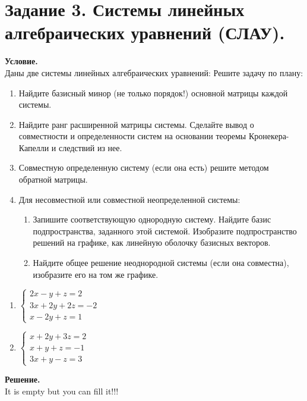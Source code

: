 \section{Задание 3. Системы линейных алгебраических уравнений (СЛАУ).}

\textbf{Условие.}\\
Даны две системы линейных алгебраических уравнений:
Решите задачу по плану:
\begin{enumerate}
    \item Найдите базисный минор (не только порядок!) основной матрицы каждой системы.
    \item Найдите ранг расширенной матрицы системы. Сделайте вывод о совместности и
    определенности систем на основании теоремы Кронекера-Капелли и следствий из нее.
    \item Совместную определенную систему (если она есть) решите методом обратной матрицы.
    \item Для несовместной или совместной неопределенной системы:
    \begin{enumerate}
        \item Запишите соответствующую однородную систему. Найдите базис подпространства,
        заданного этой системой. Изобразите подпространство решений на графике, как
        линейную оболочку базисных векторов.
        \item Найдите общее решение неоднородной системы (если она совместна), изобразите его на
        том же графике.
    \end{enumerate}
\end{enumerate}

\begin{enumerate}
    \item $\begin{cases}
              2x - y + z = 2 \\
              3x + 2y + 2z = -2 \\
              x - 2y + z = 1
    \end{cases}$
    \item $\begin{cases}
              x + 2y + 3z = 2 \\
              x + y + z = -1 \\
              3x + y - z = 3
    \end{cases}$
\end{enumerate}
\vspace{10mm}
\noindent\textbf{Решение.}\\
It is empty but you can fill it!!!

\clearpage
